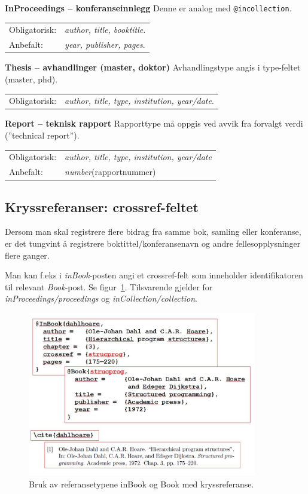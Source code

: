 \documentclass[11pt,norsk,a4paper]{article}
\newcommand{\bt}{BibTeX{}}
\newcommand{\underskrift}[1]{\vspace{.2cm}\noindent\textbf{#1}\newline}
\newcommand{\flipp}{\vspace{0.1cm}\newline\indent}
\newcommand{\mnd}{Obligatorisk}
\begin{document}
\underskrift{InProceedings -- konferanseinnlegg}
Denne er analog med \verb=@incollection=.
\flipp\begin{tabular}{ll}
\mnd:&\textit{author, title, booktitle}. \\
Anbefalt: &\textit{year, publisher, pages}.\\ 
\end{tabular}

\underskrift{Thesis -- avhandlinger (master, doktor)}
Avhandlingstype angis i type-feltet (master, phd).
\flipp\begin{tabular}{ll}
\mnd:&\textit{author, title, type, institution,
  year/date}. \\ 
\end{tabular}

\underskrift{Report -- teknisk rapport}
Rapporttype må oppgis ved avvik fra forvalgt verdi (''technical
report'').
\flipp\begin{tabular}{ll}
\mnd:&\textit{author, title, type, institution, year/date}\\
Anbefalt: & \textit{number}(rapportnummer)\\ 
\end{tabular}

\subsection{Kryssreferanser: crossref-feltet} 
Dersom man skal registrere flere bidrag fra samme bok, samling eller
konferanse, er det tungvint å registrere boktittel/konferansenavn og
andre fellesopplysninger flere ganger.

Man kan f.eks i \textit{inBook}-posten angi et crossref-felt som
inneholder identifikatoren til relevant \textit{Book}-post. Se
figur~\ref{crossref}. Tilsvarende gjelder for
\textit{inProceedings/proceedings} og
\textit{inCollection/collection}.

\begin{figure}
\begin{center}
\includegraphics[width=10cm]{./chapterinbook.jpg}
\caption{Bruk av referansetypene inBook og Book med
  kryssreferanse.}\label{crossref}
\end{center}
\end{figure}
\end{document}
